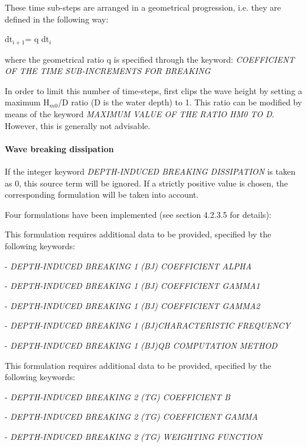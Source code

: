  These time sub-steps are arranged in a geometrical progression, i.e. they are defined in the following way:

dt${}_{i+1 }$= q dt${}_{i}$

 where the geometrical ratio q is specified through the keyword: \textit{COEFFICIENT OF THE TIME SUB-INCREMENTS FOR BREAKING}

 In order to limit this number of time-steps, \tomawac first clips the wave height by setting a maximum H${}_{m0}$/D ratio (D is the
 water depth) to 1. This ratio can be modified by means of the keyword \textit{MAXIMUM VALUE OF THE RATIO HM0 TO D}. However, this is
 generally not advisable.


\paragraph{ Wave breaking dissipation}

If the integer keyword \textit{DEPTH-INDUCED BREAKING DISSIPATION} is taken as 0, this source term will be ignored. If a strictly
positive value is chosen, the corresponding formulation will be taken into account.

 Four formulations have been implemented (see section 4.2.3.5 for details):

 \textbf{}

 This formulation requires additional data to be provided, specified by the following keywords:

 - \textit{DEPTH-INDUCED BREAKING 1 (BJ) COEFFICIENT ALPHA}

 - \textit{DEPTH-INDUCED BREAKING 1 (BJ) COEFFICIENT GAMMA1}

 - \textit{DEPTH-INDUCED BREAKING 1 (BJ) COEFFICIENT GAMMA2}

 - \textit{DEPTH-INDUCED BREAKING 1 (BJ)CHARACTERISTIC FREQUENCY }

 - \textit{DEPTH-INDUCED BREAKING 1 (BJ)QB COMPUTATION METHOD}

 \textit{}

 \textbf{}

 This formulation requires additional data to be provided, specified by the following keywords:

 - \textit{DEPTH-INDUCED BREAKING 2 (TG) COEFFICIENT B}

 - \textit{DEPTH-INDUCED BREAKING 2 (TG) COEFFICIENT GAMMA}

 - \textit{DEPTH-INDUCED BREAKING 2 (TG) WEIGHTING FUNCTION}

